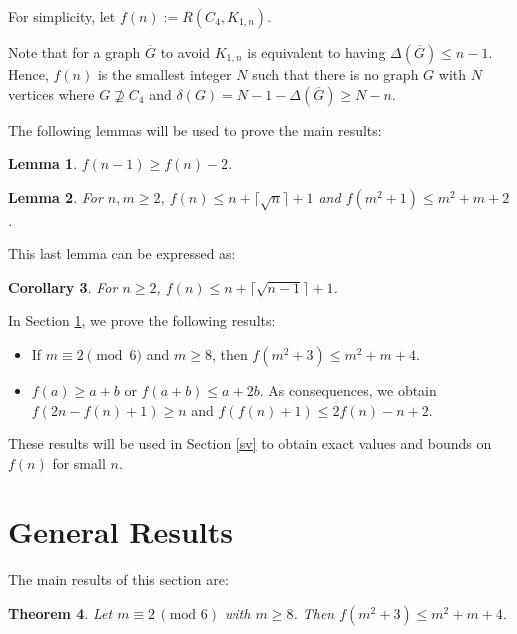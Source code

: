 \documentclass[12]{article}
\newtheorem{theorem}{Theorem}
\newtheorem{corollary}[theorem]{Corollary}
\newtheorem{lemma}[theorem]{Lemma}
\begin{document}
For simplicity, let $f(n):=R(C_4,K_{1,n})$.

Note that for a graph $\overline{G}$ to avoid $K_{1,n}$ is equivalent to having $\Delta(\overline{G}) \le n-1$. Hence, $f(n)$ is the smallest integer $N$ such that there is no graph $G$ with $N$ vertices where $G \nsupseteq C_4$ and $\delta(G)=N-1- \Delta(\overline{G})\geq N - n$.

The following lemmas will be used to prove the main results:

\begin{lemma} \label{Chen} \cite{Chen}
$f(n-1) \geq f(n) - 2$.
\end{lemma}

\begin{lemma} \label{par3} \cite{Par3}
For $n, m \geq 2$, $f(n) \leq n + \lceil\sqrt{n}\rceil + 1$ and $f(m^2 + 1) \leq m^2 + m + 2$.
\end{lemma}

This last lemma can be expressed as:
\begin{corollary} \label{cop3}
For $n \geq 2$, $f(n) \leq n + \lceil\sqrt{n-1}\rceil + 1$.
\end{corollary}

In Section \ref{gr}, we prove the following results:
\begin{itemize}
\item If $m \equiv 2 \pmod{6}$ and $m \ge 8$, then $f(m^2+3)\le m^2+m+4$.
\item $f(a)\ge a+b$ or $f(a+b)\le a+2b$. As consequences, we obtain
$f(2n-f(n)+1)\ge n$ and $f(f(n)+1)\le 2f(n)-n+2$.
\end{itemize}
These results will be used in Section \ref{sv} to obtain exact values and bounds on $f(n)$ for small $n$.

\section{General Results} \label{gr}

The main results of this section are:

\begin{theorem} \label{teo2}
Let $m\equiv 2 \,(\text{mod}\,\, 6)$ with $m\ge 8$. Then $f(m^2+3)\le m^2+m+4$.
\end{theorem}
\end{document}
